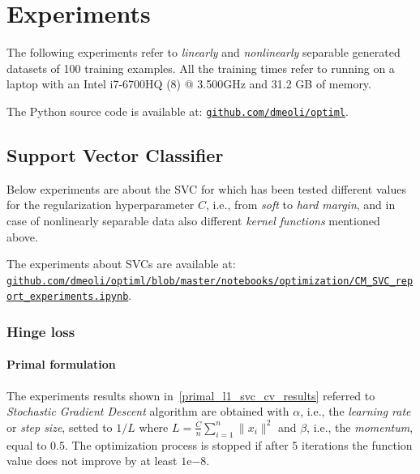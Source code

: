 \section{Experiments}

The following experiments refer to \emph{linearly} and \emph{nonlinearly} separable generated datasets of 100 training examples. All the training times refer to running on a laptop with an Intel i7-6700HQ (8) @ 3.500GHz and 31.2 GB of memory.

The Python source code is available at: \href{https://github.com/dmeoli/optiml}{\texttt{github.com/dmeoli/optiml}}.

\subsection{Support Vector Classifier}

Below experiments are about the SVC for which has been tested different values for the regularization hyperparameter $C$, i.e., from \emph{soft} to \emph{hard margin}, and in case of nonlinearly separable data also different \emph{kernel functions} mentioned above.

The experiments about SVCs are available at: \\ \href{https://github.com/dmeoli/optiml/blob/master/notebooks/optimization/CM_SVC_report_experiments.ipynb}{\texttt{github.com/dmeoli/optiml/blob/master/notebooks/optimization/CM\_SVC\_report\_experiments.ipynb}}.

\subsubsection{Hinge loss}

\paragraph{Primal formulation}


The experiments results shown in~\ref{primal_l1_svc_cv_results} referred to \emph{Stochastic Gradient Descent} algorithm are obtained with $\alpha$, i.e., the \emph{learning rate} or \emph{step size}, setted to $1/L$ where $\displaystyle L = \frac{C}{n} \sum_{i=1}^n \| x_i \|^2$ and $\beta$, i.e., the \emph{momentum}, equal to 0.5. The optimization process is stopped if after 5 iterations the function value does not improve by at least $1\mathrm{e}{-8}$.

